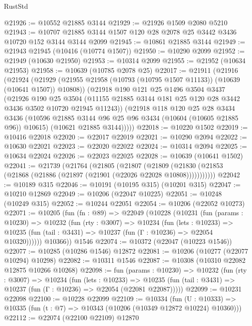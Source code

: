 \begin{lexlean}{RustStd}
\begin{coremodule}
@21926 := @10552 @21885 @3144
@21929 := @21926 @1509 @2080 @5210
@21943 := @10707 @21885 @3144 @1507 @120 @28 @2078 @25 @3442 @3436 @10720 @152 @3144 @3144 @2099
@21945 := @10861 @21885 @3144
@21949 := @21943 @21945 (@10416 (@10774 @1507))
@21950 := @10290 @2099
@21952 := @21949 (@10630 @21950)
@21953 := @10314 @2099
@21955 := @21952 (@10634 @21953)
@21958 := @10639 (@10785 @2078 @25)
@22017 := @21911
    (@21916
      (@21924
        (@21929 (@21955 @21958 (@10793 (@10795 @1507 @11133)) (@10639 (@10641 @1507)) @10808))
        (@21918
          @190
          @121
          @25
          @1496
          @3504
          @3437
          (@21926
            @190
            @25
            @3504
            (@11155 @21885 @3144 @181 @25 @120 @28 @3442 @3436 @3502 @10720 @21945 @11243))
          (@21918
            @118
            @120
            @25
            @28
            @3434
            @3436
            (@10596 @21885 @3144 @96 @25 @96 @3434 (@10604 (@10605 @21885 @96)) @10615)
            (@10621 @21885 @3144)))))
@22018 := @10220 @1502
@22019 := @10416 @22018
@22020 := @22017 @22019
@22021 := @10290 @2094
@22022 := @10630 @22021
@22023 := @22020 @22022
@22024 := @10314 @2094
@22025 := @10634 @22024
@22026 := @22023 @22025
@22028 := @10639 (@10641 @1502)
@22041 := @21739
    (@21764
      (@21805
        (@21807
          (@21809 (@21830 (@21853 (@21868 (@21886 (@21897 (@21901 (@22026 @22028 @10808)))))))))))
@22042 := @10189 @315
@22046 := @10191 (@10195 @315) (@10201 @315)
@22047 := @10210 @12869
@22049 := @10206 (@22047 @10225)
@22051 := @10248 (@10249 @315)
@22052 := @10244 @22051
@22054 := @10206 (@22052 @10273)
@22071 := @10205
    (fun (fn : @89) =>
    @22049
      (@10228
        (@10231
          (fun (params : @10230) =>
          @10232
            (fun (rty : @3007) =>
            @10234
              (fun (lets : @10233) =>
              @10235 (fun (tail : @3431) => @10237 (fun (Γ : @10236) => @22054 @10320))))))
        @10366))
    @1546
@22074 := @10372 (@22047 (@10223 @1546))
@22077 := @10285 (@10286 @1546) @12872
@22081 := @10206 (@10277 (@22077 @10294) @10298)
@22082 := @10311 @1546
@22087 := @10308 (@10310 @22082 @12875 @10266 @10268)
@22098 := fun (params : @10230) =>
  @10232
    (fun (rty : @3007) =>
    @10234
      (fun (lets : @10233) =>
      @10235 (fun (tail : @3431) => @10237 (fun (Γ : @10236) => @22054 (@22081 @22087)))))
@22099 := @10231 @22098
@22100 := @10228 @22099
@22109 := @10334
    (fun (U : @10333) => @10335 (fun (t : @7) => @10343 (@10206 (@10349 @12872 @10224) @10360)))
@22112 := @22074 (@22100 @22109) @12870

\end{coremodule}
\end{lexlean}
